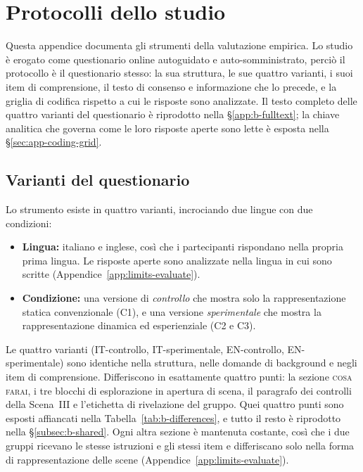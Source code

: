 
\chapter{Protocolli dello studio}
\label{app:protocols}

Questa appendice documenta gli strumenti della valutazione empirica. Lo studio è erogato come questionario online autoguidato e auto-somministrato, perciò il protocollo è il questionario stesso: la sua struttura, le sue quattro varianti, i suoi item di comprensione, il testo di consenso e informazione che lo precede, e la griglia di codifica rispetto a cui le risposte sono analizzate. Il testo completo delle quattro varianti del questionario è riprodotto nella \S\ref{app:b-fulltext}; la chiave analitica che governa come le loro risposte aperte sono lette è esposta nella \S\ref{sec:app-coding-grid}.

\section{Varianti del questionario}
\label{app:b-variants}

Lo strumento esiste in quattro varianti, incrociando due lingue con due condizioni:

\begin{itemize}
    \item \textbf{Lingua:} italiano e inglese, così che i partecipanti rispondano nella propria prima lingua. Le risposte aperte sono analizzate nella lingua in cui sono scritte (Appendice~\ref{app:limits-evaluate}).
    \item \textbf{Condizione:} una versione di \emph{controllo} che mostra solo la rappresentazione statica convenzionale (C1), e una versione \emph{sperimentale} che mostra la rappresentazione dinamica ed esperienziale (C2 e C3).
\end{itemize}

\noindent Le quattro varianti (IT-controllo, IT-sperimentale, EN-controllo, EN-sperimentale) sono identiche nella struttura, nelle domande di background e negli item di comprensione. Differiscono in esattamente quattro punti: la sezione \textsc{cosa farai}, i tre blocchi di esplorazione in apertura di scena, il paragrafo dei controlli della Scena~III e l'etichetta di rivelazione del gruppo. Quei quattro punti sono esposti affiancati nella Tabella~\ref{tab:b-differences}, e tutto il resto è riprodotto nella \S\ref{subsec:b-shared}. Ogni altra sezione è mantenuta costante, così che i due gruppi ricevano le stesse istruzioni e gli stessi item e differiscano solo nella forma di rappresentazione delle scene (Appendice~\ref{app:limits-evaluate}).

